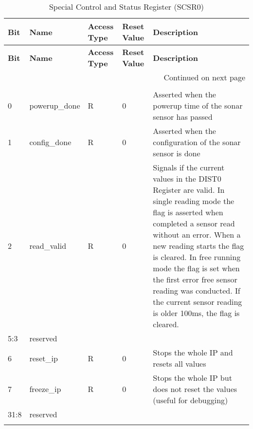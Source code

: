     \begin{longtable}{|p{1cm}|p{3cm}|p{2cm}|p{1cm}|p{6.25cm}|}
    \hline
    \textbf{Bit} & \textbf{Name} & \textbf{Access Type} & \textbf{Reset Value} & \textbf{Description} \\
    \hline
    \endfirsthead
    \hline
    \textbf{Bit} & \textbf{Name} & \textbf{Access Type} & \textbf{Reset Value} & \textbf{Description} \\
    \hline
    \endhead
    \hline \multicolumn{5}{|r|}{{Continued on next page}} \\ \hline
    \endfoot
    \hline
    \endlastfoot

    \multicolumn{5}{|c|}{\textbf{0x18 SCSR0 - Special Control and Status Register}} \\
    \hline
    0 & powerup\_done & R & 0 & Asserted when the powerup time of the sonar sensor has passed \\
    \hline
    1 & config\_done & R & 0 & Asserted when the configuration of the sonar sensor is done \\
    \hline
    2 & read\_valid & R & 0 & Signals if the current values in the DIST0 Register are valid.
    \newline In single reading mode the flag is asserted when completed a sensor read without an error. When a new reading starts the flag is cleared.
    \newline In free running mode the flag is set when the first error free sensor reading was conducted. If the current sensor reading is older 100ms, the flag is cleared.
    \\
    \hline
    5:3 & reserved & & & \\
    \hline
    6 & reset\_ip & R & 0 & Stops the whole IP and resets all values \\
    \hline
    7 & freeze\_ip & R & 0 & Stops the whole IP but does not reset the values (useful for debugging) \\
    \hline
    31:8 & reserved & & & \\
    \hline
    \caption{Special Control and Status Register (SCSR0)}
    \label{tab:scsr0}
    \end{longtable}

